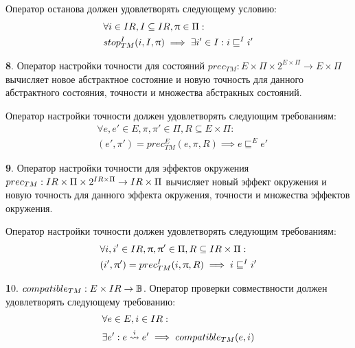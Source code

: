 Оператор останова должен удовлетворять следующему условию:
\begin{equation}
\label{cpa_stop_tm_i_eq}
\begin{aligned}
&\forall i \in IR, I \subseteq IR, \uppi \in \Pi:\\
&stop^I_{TM}(i, I, \uppi) \implies\exists i'\in I: i \sqsubseteq^I i'
\end{aligned}
\end{equation}

{\textbf 8.} Оператор настройки точности для состояний $prec_{TM}:E \times \Pi \times 2^{E \times \Pi} \rightarrow E \times \Pi$ вычисляет новое абстрактное состояние и новую точность для данного абстрактного состояния, точности и множества абстракных состояний.

Оператор настройки точности должен удовлетворять следующим требованиям:
\begin{equation}
\label{prec_tm_e_equation}
\begin{aligned}
& \forall e, e' \in E, \pi, \pi' \in \Pi, R \subseteq E \times \Pi:\\
& (e', \pi') = prec^E_{TM}(e, \pi, R) \implies e \sqsubseteq^E e'
\end{aligned}
\end{equation}

{\textbf 9.} Оператор настройки точности для эффектов окружения $prec_{TM}:IR \times \Pi \times 2^{IR \times \Pi} \rightarrow IR \times \Pi$ 
вычисляет новый эффект окружения и новую точность для данного эффекта окружения, точности и множества эффектов окружения.

Оператор настройки точности должен удовлетворять следующим требованиям:
\begin{equation}
\label{prec_tm_i_equation}
\begin{aligned}
& \forall i, i' \in IR, \uppi, \uppi' \in \Pi, R \subseteq IR \times \Pi:\\
& (i', \uppi') = prec^I_{TM}(i, \uppi, R) \implies i \sqsubseteq^I i'
\end{aligned}
\end{equation}

{\textbf 10.} $compatible_{TM}: E \times IR \to \mathbb{B}$.
Оператор проверки совмествности должен удовлетворять следующему требованию:
\begin{equation}
\label{compatible_tm_equation}
\begin{aligned}
& \forall e \in E, i \in IR:\\
& \exists e': e \stackrel{i}{\leadsto} e' \implies compatible_{TM}(e,i)
\end{aligned}
\end{equation}

